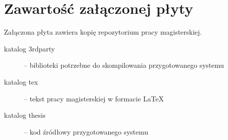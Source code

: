 \chapter{Zawartość załączonej płyty}

Załączona płyta zawiera kopię repozytorium pracy magisterskiej.

\begin{description}

\item[katalog 3rdparty] --
biblioteki potrzebne do skompilowania przygotowanego systemu

\item[katalog tex] --
tekst pracy magisterskiej w formacie \LaTeX

\item[katalog thesis] --
kod źródłowy przygotowanego systemu


\end{description}